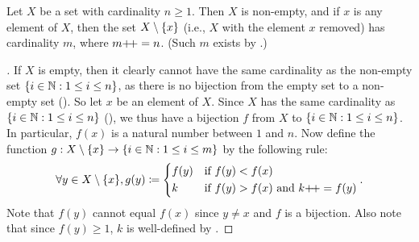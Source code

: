 \begin{lem}\label{i:3.6.9}
  Let \(X\) be a set with cardinality \(n \geq 1\).
  Then \(X\) is non-empty, and if \(x\) is any element of \(X\), then the set \(X \setminus \left\lbrace x\right\rbrace\) (i.e., \(X\) with the element \(x\) removed) has cardinality \(m\), where \(m{+}\!{+} = n\).
  (Such \(m\) exists by .)
\end{lem}

\begin{proof}[]
  If \(X\) is empty, then it clearly cannot have the same cardinality as the non-empty set \(\left\lbrace i \in \mathbb{N} : 1 \leq i \leq n\right\rbrace\), as there is no bijection from the empty set to a non-empty set ().
  So let \(x\) be an element of \(X\).
  Since \(X\) has the same cardinality as \(\left\lbrace i \in \mathbb{N} : 1 \leq i \leq n\right\rbrace\) (), we thus have a bijection \(f\) from \(X\) to \(\left\lbrace i \in \mathbb{N} : 1 \leq i \leq n\right\rbrace\).
  In particular, \(f(x)\) is a natural number between \(1\) and \(n\).
  Now define the function \(g : X \setminus \left\lbrace x\right\rbrace \to \left\lbrace i \in \mathbb{N} : 1 \leq i \leq m\right\rbrace\) by the following rule:
  \[
    \forall y \in X \setminus \set{x}, g(y) \coloneqq \begin{dcases}
      f(y) & \text{if } f(y) < f(x)                          \\
      k    & \text{if } f(y) > f(x) \text{ and } k\pp = f(y)
    \end{dcases}.
  \]
  Note that \(f(y)\) cannot equal \(f(x)\) since \(y \neq x\) and \(f\) is a bijection.
  Also note that since \(f(y) \geq 1\), \(k\) is well-defined by .


\end{proof}

